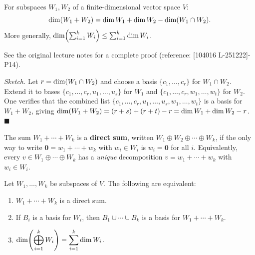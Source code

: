 \begin{thmbox}
\label{thm:dim-formula}
For subspaces $W_1, W_2$ of a finite-dimensional vector space $V$:
\[
    \operatorname{dim}(W_1+W_2) = \operatorname{dim} W_1 + \operatorname{dim} W_2 - \operatorname{dim}(W_1\cap W_2).
\]
More generally, $\operatorname{dim}\!\left(\sum_{i=1}^k W_i\right)\le\sum_{i=1}^k\operatorname{dim} W_i$.
\end{thmbox}

\begin{proofbox}
See the original lecture notes for a complete proof
(reference: [104016 L-251222]-P14).

\medskip\noindent
\textit{Sketch.}  Let $r=\operatorname{dim}(W_1\cap W_2)$ and choose a basis
$\{c_1,\ldots,c_r\}$ for $W_1\cap W_2$.  Extend it to bases
$\{c_1,\ldots,c_r,u_1,\ldots,u_s\}$ for $W_1$ and
$\{c_1,\ldots,c_r,w_1,\ldots,w_t\}$ for $W_2$.  One verifies that the
combined list $\{c_1,\ldots,c_r,u_1,\ldots,u_s,w_1,\ldots,w_t\}$ is a basis
for $W_1+W_2$, giving $\operatorname{dim}(W_1+W_2)=(r+s)+(r+t)-r=\operatorname{dim} W_1+\operatorname{dim} W_2-r$.
\hfill$\blacksquare$
\end{proofbox}

\begin{defbox}
\label{def:direct-sum}
The sum $W_1+\cdots+W_k$ is a \textbf{direct sum}, written
$W_1\oplus W_2\oplus\cdots\oplus W_k$, if the only way to write
$\mathbf{0}=w_1+\cdots+w_k$ with $w_i\in W_i$ is $w_i=\mathbf{0}$ for all
$i$.  Equivalently, every $v\in W_1\oplus\cdots\oplus W_k$ has a
\emph{unique} decomposition $v=w_1+\cdots+w_k$ with $w_i\in W_i$.
\end{defbox}

\begin{propbox}
\label{prop:direct-sum-equiv}
Let $W_1,\ldots,W_k$ be subspaces of $V$.  The following are equivalent:
\begin{enumerate}[label=(\roman*)]
    \item $W_1+\cdots+W_k$ is a direct sum.
    \item If $B_i$ is a basis for $W_i$, then $B_1\cup\cdots\cup B_k$ is a
          basis for $W_1+\cdots+W_k$.
    \item $\operatorname{dim}\!\left(\displaystyle\bigoplus_{i=1}^k W_i\right)
          = \displaystyle\sum_{i=1}^k \operatorname{dim} W_i$.
\end{enumerate}
\end{propbox}

